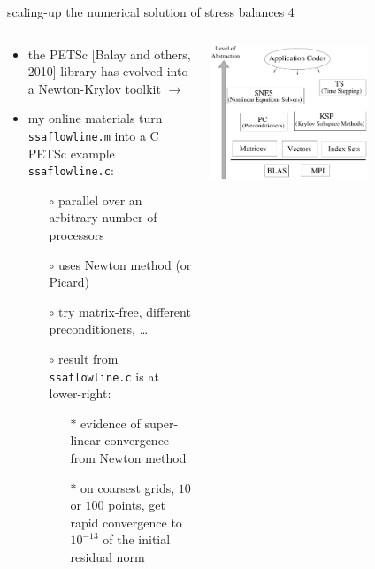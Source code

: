 \begin{frame}{scaling-up the numerical solution of stress balances 4}

\begin{columns}
\begin{column}{0.5\textwidth}
\begin{itemize}
\small
\item the PETSc [Balay and others, 2010]\nocite{petsc-user-ref} library has evolved into a Newton-Krylov toolkit \quad $\to$
\item my online materials turn \texttt{ssaflowline.m} into a C PETSc example \texttt{ssaflowline.c}:
  \begin{itemize}
  \small
  \item[$\circ$] parallel over an arbitrary number of processors
  \item[$\circ$] uses Newton method (or Picard)
  \item[$\circ$] try matrix-free, different preconditioners, \dots
  \item[$\circ$] result from \texttt{ssaflowline.c} is at lower-right:
     \begin{itemize}
     \scriptsize
     \item[$\ast$] evidence of super-linear convergence from Newton method
     \item[$\ast$] on coarsest grids, $10$ or $100$ points, get rapid convergence to $10^{-13}$ of the initial residual norm
     \end{itemize}
  \end{itemize}
\end{itemize}
\end{column}
\begin{column}{0.6\textwidth}
\begin{center}
\includegraphics[width=0.65\textwidth]{photos/petscwww}
\end{center}


\end{column}
\end{columns}
\end{frame}
